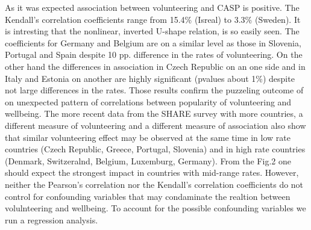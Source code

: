 \documentclass[10pt, letterpaper]{article}
\begin{document}
\begin{spacing}{1.4}
%



As it was expected association between volunteering and CASP  is positive. The Kendall's correlation coefficients range from 15.4\% (Isreal) to 3.3\% (Sweden).  It is intresting that the nonlinear, inverted U-shape relation, is so easily seen. The coefficients for Germany and Belgium are on a similar level as those in Slovenia, Portugal and Spain despite 10 pp. difference in the rates of volunteering. On the other hand the differences in association in Czech Republic on an one side and in Italy and Estonia on another are highly significant (pvalues about 1\%) despite not large differences in the rates. Those results confirm the puzzeling outcome of \citet{haski09} on unexpected pattern of correlations between  popularity of volunteering and wellbeing.  The more recent data from the SHARE survey with more countries, a different measure of volunteering and a different measure of association also show that similar volunteering effect may be observed at the same time in low rate countries (Czech Republic, Greece, Portugal, Slovenia) and in high rate countries (Denmark, Switzeralnd, Belgium, Luxemburg, Germany). From the Fig.2 one should expect the strongest impact in countries with mid-range rates. However, neither the Pearson's correlation  nor the Kendall's correlation coefficients  do not control for confounding variables that may condaminate the realtion between volulnteering and wellbeing. To account for the possible confounding variables we run a regression analysis.   


\end{spacing}
\end{document}
